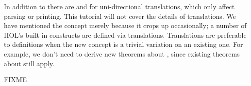 \begin{isabellebody}
\begin{isamarkuptext}
In addition to \isa{{\isasymrightleftharpoons}} there are
\isa{{\isasymrightharpoonup}}
and \isa{{\isasymleftharpoondown}}
for uni-directional translations, which only affect
parsing or printing.  This tutorial will not cover the details of
translations.  We have mentioned the concept merely because it
crops up occasionally; a number of HOL's built-in constructs are defined
via translations.  Translations are preferable to definitions when the new 
concept is a trivial variation on an existing one.  For example, we
don't need to derive new theorems about \isa{{\isasymnoteq}}, since existing theorems
about \isa{{\isacharequal}} still apply.%
%
%
\end{isamarkuptext}%
\isamarkuptrue%
%
\isamarkuptrue%
%
\isamarkuptrue%
%
\isamarkuptrue%
%
\isamarkuptrue%
%
\isamarkuptrue%
%
\begin{isamarkuptext}%
FIXME%
\end{isamarkuptext}%
\isamarkuptrue%
\isamarkupfalse%
\end{isabellebody}%
